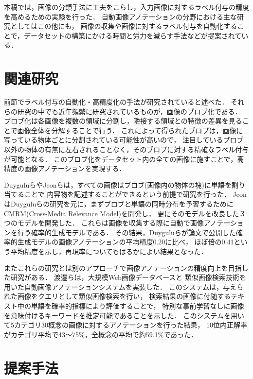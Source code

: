 本稿では，画像の分類手法に工夫をこらし，入力画像に対するラベル付与の精度を高めるための実験を行った．
自動画像アノテーションの分野における主な研究としてはこの他にも，
画像の収集や画像に対するラベル付与を自動化することで，データセットの構築にかける時間と労力を減らす手法などが提案されている．

\chapter{関連研究}
\label{sec:related}
前節でラベル付与の自動化・高精度化の手法が研究されていると述べた．
それらの研究の中でも近年頻繁に研究されているものが，画像のブロブ化である．
ブロブ化は各画像を複数の領域に分割し，隣接する領域との特徴の差異を見ることで画像全体を分解することで行う．
これによって得られたブロブは，画像に写っている物体ごとに分割されている可能性が高いので，
注目しているブロブ以外の物体の有無に左右されることなく，そのブロブに対する精確なラベル付与が可能となる．
このブロブ化をデータセット内の全ての画像に施すことで，高精度の画像アノテーションを実現する．

Duygulu\cite{duygulu}らやJeon\cite{jeon}らは，すべての画像はブロブ(画像内の物体の塊)に単語を割り当てることで
内容物を記述することができるという前提で研究を行った．
JeonはDuyguluらの研究を元に，まずブロブと単語の同時分布を予習するためにCMRM(Cross-Media Relevance Model)を開発し，
更にそのモデルを改良した３つのモデルを開発した．
これらは画像を収集する際に自動で画像アノテーションを行う確率的生成モデルである．
その結果，Duyguluらが論文で公開した確率的生成モデルの画像アノテーションの平均精度0.20に比べ，
ほぼ倍の0.41という平均精度を示し，再現率についてもはるかによい結果となった．

またこれらの研究とは別のアプローチで画像アノテーションの精度向上を目指した研究がある．
渡邉ら\cite{watanabe}は，大規模Web画像データベースと
類似画像検索技術を用いた自動画像アノテーションシステムを実装した．
このシステムは，与えられた画像をクエリとして類似画像検索を行い，
検索結果の画像に付随するテキスト中の単語を確率的指標により評価することで，
特別な事前学習なしに画像を意味付けるキーワードを推定可能であることを示した．
このシステムを用いて5カテゴリ30概念の画像に対するアノテーションを行った結果，
10位内正解率がカテゴリ平均で43～75\%，全概念の平均で約59.1\%であった．

\chapter{提案手法}
\label{sec:way}
